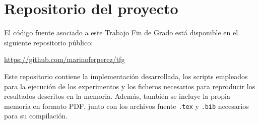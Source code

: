 \chapter{Repositorio del proyecto}

El código fuente asociado a este Trabajo Fin de Grado está disponible en el siguiente repositorio público:

\begin{center}
\url{https://github.com/marinoferperez/tfg}
\end{center}

Este repositorio contiene la implementación desarrollada, los scripts empleados 
para la ejecución de los experimentos y los ficheros necesarios para reproducir 
los resultados descritos en la memoria. Además, también se incluye la propia 
memoria en formato PDF, junto con los archivos fuente \texttt{.tex} y 
\texttt{.bib} necesarios para su compilación.